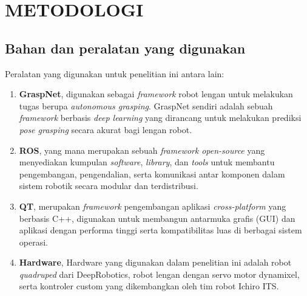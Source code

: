 \chapter{METODOLOGI}


\section{Bahan dan peralatan yang digunakan}

Peralatan yang digunakan untuk penelitian ini antara lain:

\begin{enumerate}
  \item \textbf{GraspNet}, digunakan sebagai \emph{framework} robot lengan untuk
  melakukan tugas berupa \emph{autonomous grasping}. GraspNet sendiri adalah sebuah \emph{framework}
  berbasis \emph{deep learning} yang dirancang untuk melakukan prediksi \emph{pose grasping} secara akurat bagi lengan robot.
  \item \textbf{ROS}, yang mana merupakan sebuah \emph{framework}
  \emph{open-source} yang menyediakan kumpulan \emph{software}, \emph{library}, dan \emph{tools} untuk membantu pengembangan,
  pengendalian, serta komunikasi antar komponen dalam sistem robotik secara modular dan terdistribusi.
  \item \textbf{QT}, merupakan \emph{framework} pengembangan aplikasi \emph{cross-platform} yang berbasis C++,
  digunakan untuk membangun antarmuka grafis (GUI) dan aplikasi dengan performa tinggi serta kompatibilitas luas di berbagai sistem operasi.
  \item \textbf{Hardware}, Hardware yang digunakan dalam penelitian ini adalah robot \emph{quadruped} dari DeepRobotics,
  robot lengan dengan servo motor dynamixel, serta kontroler custom yang dikembangkan oleh tim robot Ichiro ITS.
\end{enumerate}


